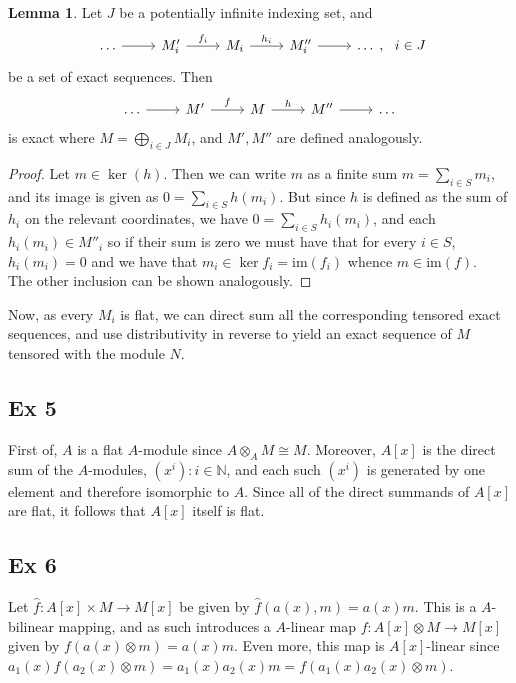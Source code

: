 \documentclass{article}
\theoremstyle{definition}
\newtheorem{lemma}[theorem]{Lemma}
\newcommand{\N}{\mathbb{N}}
\newcommand{\im}{\text{im}}
\begin{document}
\begin{lemma}
	Let $J$ be a potentially infinite indexing set, and 
	\[
		\begin{tikzcd}
			\ldots \arrow{r} &
			M'_{i} \arrow{r}{f_i} &
			M_{i} \arrow{r}{h_i} &
			M''_{i} \arrow{r} &
			\ldots
		\end{tikzcd}, \ \ i \in J
	\] 
	be a set of exact sequences. Then
	\[
		\begin{tikzcd}
			\ldots \arrow{r} &
			M' \arrow{r}{f} &
			M \arrow{r}{h} &
			M'' \arrow{r} &
			\ldots
		\end{tikzcd}
	\] 
	is exact where $M = \bigoplus_{i \in J} M_{i}$, and $M', M''$ are defined
	analogously.
\end{lemma}
\begin{proof}
	Let $m \in \ker(h)$. Then we can write $m$ as a finite sum $m = \sum_{i \in
	S} m_i$, and its image is given as $0 = \sum_{i \in S} h(m_i)$. But since
	$h$ is defined as the sum of $h_i$ on the relevant coordinates, we have $0
	= \sum_{i \in S} h_i(m_i)$, and each $h_i(m_i) \in M''_i$ so if their sum is
	zero we must have that for every $i \in S$, $h_i(m_i) = 0$ and we have that
	$m_i \in \ker f_i = \im(f_i)$ whence $m \in \im(f)$. \\

	The other inclusion can be shown analogously. 
\end{proof}

Now, as every $M_i$ is flat, we can direct sum all the corresponding tensored
exact sequences, and use distributivity in reverse to yield an exact sequence
of $M$ tensored with the module $N$.

\subsection*{Ex 5}

First of, $A$ is a flat $A$-module since $A \otimes_{A} M \cong M$. Moreover,
$A[x]$ is the direct sum of the $A$-modules, $(x^i) : i \in \N$, and each such
$(x^i)$ is generated by one element and therefore isomorphic to $A$. Since all
of the direct summands of $A[x]$ are flat, it follows that $A[x]$ itself is
flat.


\subsection*{Ex 6}
Let $\hat{f} : A[x] \times M \to M[x]$ be given by $\hat{f}(a(x), m) = a(x)m$.
This is a $A$-bilinear mapping, and as such introduces a $A$-linear map $f :
A[x] \otimes M \to M[x]$ given by $f(a(x) \otimes m) = a(x)m$. Even more, this
map is $A[x]$-linear since $a_1(x)f(a_2(x) \otimes m) = a_1(x)a_2(x)m =
f(a_1(x)a_2(x) \otimes m)$. \\
\end{document}
